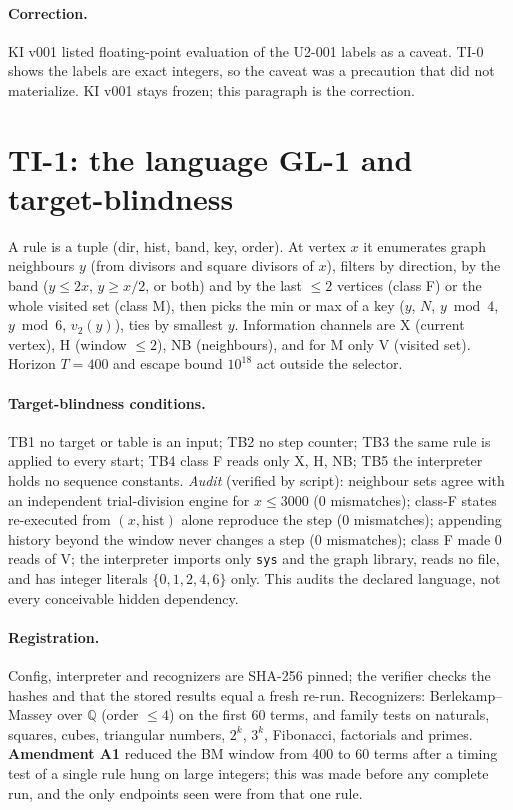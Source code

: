 \documentclass[11pt]{article}
\begin{document}
\paragraph{Correction.} KI v001 listed floating-point evaluation of the U2-001 labels as a caveat. TI-0 shows the labels are exact integers, so the caveat was a precaution that did not materialize. KI v001 stays frozen; this paragraph is the correction.

\section{TI-1: the language GL-1 and target-blindness}
A rule is a tuple (dir, hist, band, key, order). At vertex $x$ it enumerates graph neighbours $y$ (from divisors and square divisors of $x$), filters by direction, by the band ($y\le2x$, $y\ge x/2$, or both) and by the last $\le2$ vertices (class F) or the whole visited set (class M), then picks the min or max of a key ($y$, $N$, $y\bmod4$, $y\bmod6$, $v_2(y)$), ties by smallest $y$. Information channels are X (current vertex), H (window $\le2$), NB (neighbours), and for M only V (visited set). Horizon $T=400$ and escape bound $10^{18}$ act outside the selector.

\paragraph{Target-blindness conditions.} TB1 no target or table is an input; TB2 no step counter; TB3 the same rule is applied to every start; TB4 class F reads only X, H, NB; TB5 the interpreter holds no sequence constants. \emph{Audit} (verified by script): neighbour sets agree with an independent trial-division engine for $x\le3000$ (0 mismatches); \LocN{} class-F states re-executed from $(x,\text{hist})$ alone reproduce the step (0 mismatches); appending history beyond the window never changes a step (0 mismatches); class F made 0 reads of V; the interpreter imports only \texttt{sys} and the graph library, reads no file, and has integer literals $\{0,1,2,4,6\}$ only. This audits the declared language, not every conceivable hidden dependency.

\paragraph{Registration.} Config, interpreter and recognizers are SHA-256 pinned; the verifier checks the hashes and that the stored results equal a fresh re-run. Recognizers: Berlekamp--Massey over $\mathbb Q$ (order $\le4$) on the first 60 terms, and family tests on naturals, squares, cubes, triangular numbers, $2^k$, $3^k$, Fibonacci, factorials and primes. \textbf{Amendment A1} reduced the BM window from 400 to 60 terms after a timing test of a single rule hung on large integers; this was made before any complete run, and the only endpoints seen were from that one rule.
\end{document}
